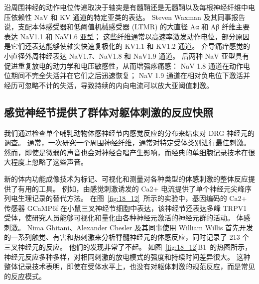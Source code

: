 沿周围神经的动作电位传递取决于轴突是有髓鞘还是无髓鞘以及每根神经纤维中电压依赖性 NaV 和 KV 通道的特定亚类的表达。
Steven Waxman 及其同事报告说，支配本体感受器和低阈值机械感受器 (LTMR) 的大直径 Aα 和 Aβ 纤维主要表达 NaV1.1 和 NaV1.6 亚型；
这些纤维通常以高速率激发动作电位，部分原因是它们还表达能够使轴突快速复极化的 KV1.1 和 KV1.2 通道。
介导痛痒感觉的小直径外周神经表达 NaV1.7、NaV1.8 和 NaV1.9 通道。
后两种 NaV 亚型具有促进重复放电的动力学和电压敏感性，从而增强疼痛感：
NaV 1.8 通道在动作电位期间不完全失活并在它们之后迅速恢复； 
NaV 1.9 通道在相对负电位下激活并经历可忽略不计的失活，导致持续的内向电流可以放大亚阈值刺激。



\subsection{感觉神经节提供了群体对躯体刺激的反应快照}

我们通过检查单个哺乳动物体感神经节内感觉反应的分布来结束对 DRG 神经元的调查。
通常，一次研究一个周围神经纤维，通常对特定受体类别进行最佳刺激。
然而，即使是微弱的声音也会对神经合唱产生影响，而经典的单细胞记录技术在很大程度上忽略了这些声音。


新的体内功能成像技术为标记、可视化和测量对各种类型的体感刺激的整体反应提供了有用的工具。
例如，由感觉刺激诱发的 Ca2+ 电流提供了单个神经元尖峰序列电生理记录的替代方法。
在图~\ref{fig:18_12}~所示的实验中，基因编码的 Ca2+ 传感器 GCaMP6f 在小鼠三叉神经节细胞中表达，该神经节还表达多峰 TRPV1 受体，使研究人员能够可视化和量化由各种神经元激活的神经元群的活动。 体感刺激。
Nima Ghitani、Alexander Chesler 及其同事使用 William Willis 首先开发的一系列触觉、有害和热刺激来分析脊髓神经元的体感反应，同时记录了 213 个三叉神经元的反应。
他们的发现非常了不起。
如图~\ref{fig:18_12}B1~的热图所示，神经元反应多种多样，对相同刺激的放电模式的强度和持续时间差异很大。 
这种整体记录技术表明，即使在受体水平上，也没有对躯体刺激的规范反应，而是常见的反应模式。

